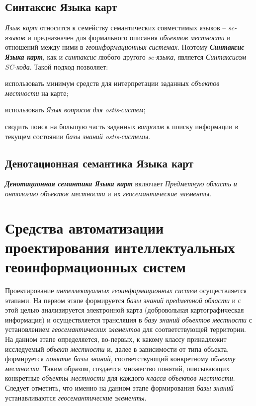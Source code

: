 \subsection{Синтаксис Языка карт}
\label{chapter_gis_sec_map_syntax}

\textit{Язык карт} относится к семейству семантических совместимых языков – \textit{sc-языков} и предназначен для формального описания \textit{объектов местности} и отношений между ними в \textit{геоинформационных системах}. Поэтому \textbf{\textit{Синтаксис Языка карт}}, как и \textit{синтаксис} любого другого \textit{sc-языка}, является \textit{Синтаксисом SC-кода}. Такой подход позволяет:
\begin{textitemize}
\item использовать минимум средств для интерпретации заданных \textit{объектов местности} на карте;
\item использовать \textit{Язык вопросов для ostis-систем};
\item сводить поиск на большую часть заданных \textit{вопросов} к поиску информации в текущем состоянии \textit{базы знаний ostis-системы}.
\end{textitemize}

\subsection{Денотационная семантика Языка карт}
\label{chapter_gis_sec_map_semantics}

\textbf{\textit{Денотационная семантика Языка карт}} включает \textit{Предметную область и онтологию объектов местности} и их \textit{геосемантические элементы}.

\section{Средства автоматизации проектирования интеллектуальных геоинформационных систем}
\label{chapter_gis_sec_automatization}

Проектирование \textit{интеллектуалных геоинформационных систем} осуществляется этапами. 
На первом этапе формируется \textit{базы знаний} \textit{предметной области} и с этой целью анализируется электронной карта (добровольная картографическая информация) и осуществляется трансляция в \textit{базу знаний} \textit{объектов местности} с установлением \textit{геосемантических элементов} для соответствующей территории. На данном этапе определяется, во-первых, к какому классу принадлежит исследуемый \textit{объект местности} и, далее в зависимости от типа объекта, формируется \textit{понятие} \textit{базы знаний}, соответствующий конкретному \textit{объекту местности}. Таким образом, создается множество понятий, описывающих конкретные \textit{объекты местности} для каждого \textit{класса объектов местности\scnsupergroupsign}. Следует отметить, что именно на данном этапе формирования \textit{базы знаний} устанавливаются \textit{геосемантические элементы}.

